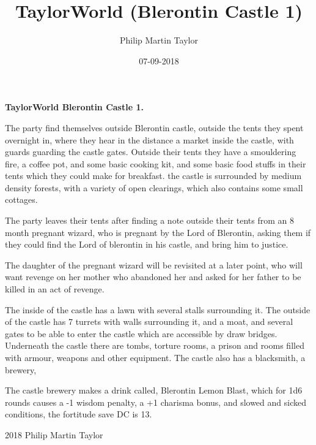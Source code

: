 \documentclass[12pt,a4paper]{book}
\date{07-09-2018}
\author{Philip Martin Taylor}
\title{TaylorWorld (Blerontin Castle 1)}
\begin{document}
\begin{center}
\textbf{TaylorWorld\texttrademark \: Blerontin Castle 1.}
\end{center}
\begin{flushleft}
  The party find themselves outside Blerontin castle, outside the tents they spent overnight in, where they hear in the distance a market inside the castle, with guards guarding the castle gates. Outside their tents they have a smouldering fire, a coffee pot, and some basic cooking kit, and some basic food stuffs in their tents which they could make for breakfast. the castle is surrounded by medium density forests, with a variety of open clearings, which also contains some small cottages.
\end{flushleft}
\begin{flushleft}
  The party leaves their tents after finding a note outside their tents from an 8 month pregnant wizard, who is pregnant by the Lord of Blerontin, asking them if they could find the Lord of blerontin in his castle, and bring him to justice. 
\end{flushleft}
\begin{flushleft}
  The daughter of the pregnant wizard will be revisited at a later point, who will want revenge on her mother who abandoned her and asked for her father to be killed in an act of revenge.
\end{flushleft}
\begin{flushleft}
  The inside of the castle has a lawn with several stalls surrounding it. The outside of the castle has 7 turrets with walls surrounding it, and a moat, and several gates to be able to enter the castle which are accessible by draw bridges. Underneath the castle there are tombs, torture rooms, a prison and rooms filled with armour, weapons and other equipment. The castle also has a blacksmith, a brewery, 
\end{flushleft}
\begin{flushleft}
  The castle brewery makes a drink called, Blerontin Lemon Blast, which for 1d6 rounds causes a -1 wisdom penalty, a +1 charisma bonus, and slowed and sicked conditions, the fortitude save DC is 13.
\end{flushleft}
\begin{flushleft}
  
\end{flushleft}
\begin{center}
  \textcopyright{} 2018 Philip Martin Taylor
\end{center}
\end{document}
